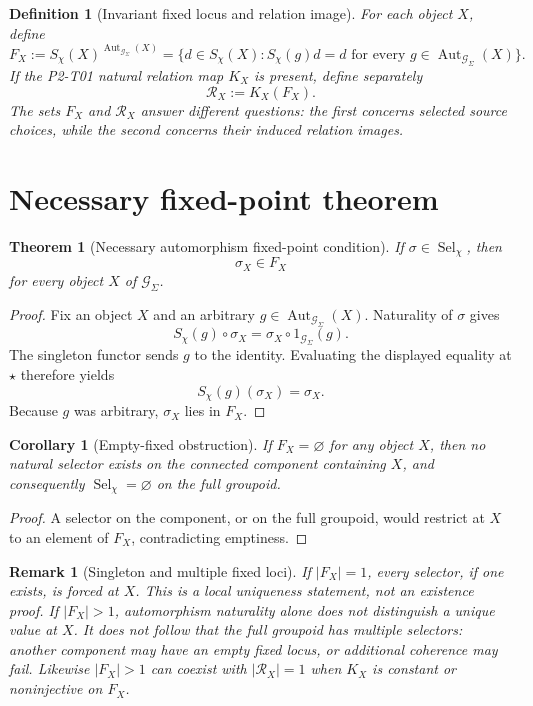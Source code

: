 \documentclass[11pt]{article}
\newtheorem{definition}{Definition}
\newtheorem{theorem}{Theorem}
\newtheorem{corollary}{Corollary}
\newtheorem{remark}{Remark}
\newcommand{\Aut}{\operatorname{Aut}}
\begin{document}
\begin{definition}[Invariant fixed locus and relation image]
For each object \(X\), define
\[
 F_X:=S_\chi(X)^{\Aut_{\mathcal G_\Sigma}(X)}
 =\{d\in S_\chi(X):S_\chi(g)d=d\text{ for every }
 g\in\Aut_{\mathcal G_\Sigma}(X)\}.
\]
If the P2-T01 natural relation map \(K_X\) is present, define separately
\[
  \mathcal R_X:=K_X(F_X).
\]
The sets \(F_X\) and \(\mathcal R_X\) answer different questions: the first
concerns selected source choices, while the second concerns their induced
relation images.
\end{definition}

\section{Necessary fixed-point theorem}

\begin{theorem}[Necessary automorphism fixed-point condition]
If \(\sigma\in\operatorname{Sel}_\chi\), then
\[
  \sigma_X\in F_X
\]
for every object \(X\) of \(\mathcal G_\Sigma\).
\end{theorem}

\begin{proof}
Fix an object \(X\) and an arbitrary
\(g\in\Aut_{\mathcal G_\Sigma}(X)\). Naturality of \(\sigma\) gives
\[
  S_\chi(g)\circ\sigma_X
  =\sigma_X\circ1_{\mathcal G_\Sigma}(g).
\]
The singleton functor sends \(g\) to the identity. Evaluating the displayed
equality at \(\star\) therefore yields
\[
  S_\chi(g)(\sigma_X)=\sigma_X.
\]
Because \(g\) was arbitrary, \(\sigma_X\) lies in \(F_X\).
\end{proof}

\begin{corollary}[Empty-fixed obstruction]
If \(F_X=\varnothing\) for any object \(X\), then no natural selector exists
on the connected component containing \(X\), and consequently
\(\operatorname{Sel}_\chi=\varnothing\) on the full groupoid.
\end{corollary}

\begin{proof}
A selector on the component, or on the full groupoid, would restrict at
\(X\) to an element of \(F_X\), contradicting emptiness.
\end{proof}

\begin{remark}[Singleton and multiple fixed loci]
If \(|F_X|=1\), every selector, if one exists, is forced at \(X\). This is a
local uniqueness statement, not an existence proof. If \(|F_X|>1\),
automorphism naturality alone does not distinguish a unique value at \(X\).
It does not follow that the full groupoid has multiple selectors: another
component may have an empty fixed locus, or additional coherence may fail.
Likewise \(|F_X|>1\) can coexist with \(|\mathcal R_X|=1\) when \(K_X\) is
constant or noninjective on \(F_X\).
\end{remark}
\end{document}
